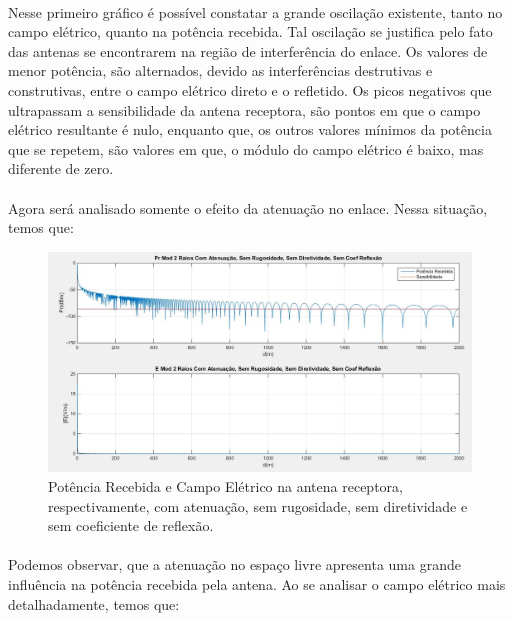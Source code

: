 \paragraph{}Nesse primeiro gráfico é possível constatar a grande oscilação existente, tanto no campo elétrico, quanto na potência recebida. Tal oscilação se justifica pelo fato das antenas se encontrarem na região de interferência do enlace. Os valores de menor potência, são alternados, devido as interferências destrutivas e construtivas, entre o campo elétrico direto e o refletido. Os picos negativos que ultrapassam a sensibilidade da antena receptora, são pontos em que o campo elétrico resultante é nulo, enquanto que, os outros valores mínimos da potência que se repetem, são  valores em que, o módulo do campo elétrico é baixo, mas diferente de zero.

\paragraph{}Agora será analisado somente o efeito da atenuação no enlace. Nessa situação, temos que:



\FloatBarrier
\begin{figure}[!htp]
\centering
\includegraphics[scale = 0.3]{Figuras/CA_SR_SD_SCR.JPG}
\caption{Potência Recebida e Campo Elétrico na antena receptora, respectivamente, com atenuação, sem rugosidade, sem diretividade e sem coeficiente de reflexão.}
\end{figure}
\FloatBarrier

\paragraph{}Podemos observar, que a atenuação no espaço livre apresenta uma grande influência na potência recebida pela antena. Ao se analisar o campo elétrico mais detalhadamente, temos que:

